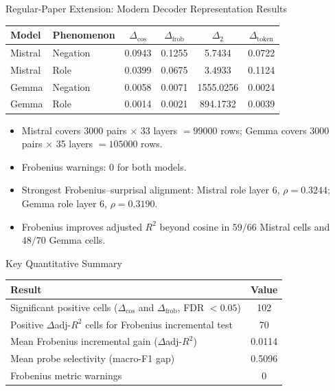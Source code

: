 \documentclass[aspectratio=169,11pt]{beamer}
\begin{document}
\begin{frame}{Regular-Paper Extension: Modern Decoder Representation Results}
\small
\begin{table}
\centering
\begin{tabular}{llcccc}
\toprule
\textbf{Model} & \textbf{Phenomenon} & \(\Delta_{\cos}\) & \(\Delta_{\text{frob}}\) & \(\Delta_{2}\) & \(\Delta_{\text{token}}\) \\
\midrule
Mistral & Negation & 0.0943 & 0.1255 & 5.7434 & 0.0722 \\
Mistral & Role & 0.0399 & 0.0675 & 3.4933 & 0.1124 \\
Gemma & Negation & 0.0058 & 0.0071 & 1555.0256 & 0.0024 \\
Gemma & Role & 0.0014 & 0.0021 & 894.1732 & 0.0039 \\
\bottomrule
\end{tabular}
\end{table}

\vspace{0.35em}
\begin{itemize}
  \item Mistral covers 3000 pairs \(\times\) 33 layers \(=99000\) rows; Gemma covers 3000 pairs \(\times\) 35 layers \(=105000\) rows.
  \item Frobenius warnings: 0 for both models.
  \item Strongest Frobenius--surprisal alignment:
  Mistral role layer 6, \(\rho=0.3244\);
  Gemma role layer 6, \(\rho=0.3190\).
  \item Frobenius improves adjusted \(R^2\) beyond cosine in \(59/66\) Mistral cells and \(48/70\) Gemma cells.
\end{itemize}
\end{frame}

\begin{frame}{Key Quantitative Summary}
\begin{table}
\centering
\small
\begin{tabular}{lc}
\toprule
\textbf{Result} & \textbf{Value} \\
\midrule
Significant positive cells (\(\Delta_{\cos}\) and \(\Delta_{\text{frob}}\), FDR \(< 0.05\)) & 102 \\
Positive \(\Delta\)adj-\(R^2\) cells for Frobenius incremental test & 70 \\
Mean Frobenius incremental gain (\(\Delta\)adj-\(R^2\)) & 0.0114 \\
Mean probe selectivity (macro-F1 gap) & 0.5096 \\
Frobenius metric warnings & 0 \\
\bottomrule
\end{tabular}
\end{table}
\end{frame}
\end{document}
